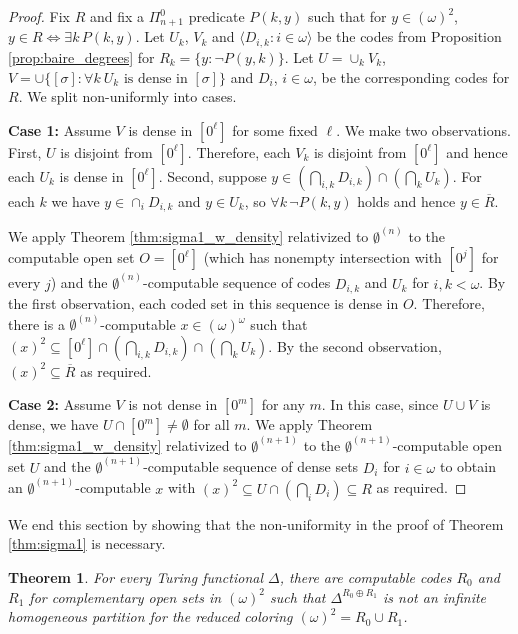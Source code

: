 \documentclass{amsart}
\newtheorem{thm}{Theorem}[section]
\theoremstyle{definition}
\theoremstyle{remark}
\begin{document}
\begin{proof}
Fix $R$ and fix a $\Pi^0_{n+1}$ predicate $P(k,y)$ such that for $y \in (\omega)^2$, 
$y \in R \Leftrightarrow \exists k \, P(k,y)$. Let $U_k$, $V_k$ and 
$\langle D_{i,k} : i \in \omega \rangle$ be the codes from Proposition \ref{prop:baire_degrees} for $R_k = \{ y : \neg P(y,k) \}$. Let 
$U = \cup_k V_k$, $V = \cup \{ [\sigma] : \forall k \ U_k \text{ is dense in } [\sigma]\}$ and $D_i$, $i \in \omega$, be the corresponding 
codes for $R$. We split non-uniformly into cases.

{\bf Case 1:} Assume $V$ is dense in $[0^\ell]$ for some fixed $\ell$. We make two observations. First, $U$ is disjoint from $[0^\ell]$. Therefore, each 
$V_k$ is disjoint from $[0^\ell]$ and hence each $U_k$ is dense in $[0^\ell]$. Second, suppose $y \in (\bigcap_{i,k} D_{i,k}) \cap (\bigcap_{k} U_k)$. For each $k$ we have 
$y \in \cap_i D_{i,k}$ and $y \in U_k$, so $\forall k \, \neg P(k,y)$ holds and hence $y \in \overline{R}$.

We apply Theorem \ref{thm:sigma1_w_density} relativized to $\emptyset^{(n)}$ to the computable open set $O = [0^\ell]$ (which has nonempty intersection with $[0^j]$ for 
every $j$) and the $\emptyset^{(n)}$-computable sequence of codes $D_{i,k}$ and $U_k$ for $i,k < \omega$. By the first observation, each coded set in this sequence is dense in 
$O$. Therefore, there is a $\emptyset^{(n)}$-computable $x \in (\omega)^{\omega}$ such that $(x)^2 \subseteq [0^{\ell}] \cap (\bigcap_{i,k} D_{i,k}) \cap 
(\bigcap_{k} U_k)$. By the second observation, $(x)^2 \subseteq \overline{R}$ as required. 
 
 {\bf Case 2:} Assume $V$ is not dense in $[0^m]$ for any $m$. In this case, since $U \cup V$ is dense, we have $U \cap [0^m] \neq \emptyset$ for all $m$. 
 We apply Theorem \ref{thm:sigma1_w_density} relativized to $\emptyset^{(n+1)}$ to the $\emptyset^{(n+1)}$-computable open set $U$ and the 
 $\emptyset^{(n+1)}$-computable sequence of dense sets $D_i$ for $i \in \omega$ to obtain an $\emptyset^{(n+1)}$-computable $x$ with 
 $(x)^2 \subseteq U \cap (\bigcap_{i} D_i) \subseteq R$ as required.  
\end{proof}

We end this section by showing that the non-uniformity in the proof of Theorem \ref{thm:sigma1} is necessary.

\begin{thm}
\label{thm:non_uniform}
For every Turing functional $\Delta$, there are computable codes $R_0$ and $R_1$ for complementary open sets in $(\omega)^2$ such
that $\Delta^{R_0 \oplus R_1}$ is not an infinite homogeneous
partition for the reduced coloring $(\omega)^2 = R_0 \cup R_1$.
\end{thm}
\end{document}
